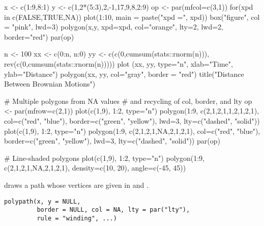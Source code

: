 %
\begin{Examples}
\begin{ExampleCode}
x <- c(1:9,8:1)
y <- c(1,2*(5:3),2,-1,17,9,8,2:9)
op <- par(mfcol=c(3,1))
for(xpd in c(FALSE,TRUE,NA)) {
  plot(1:10, main = paste("xpd =", xpd))
  box("figure", col = "pink", lwd=3)
  polygon(x,y, xpd=xpd, col="orange", lty=2, lwd=2, border="red")
}
par(op)

n <- 100
xx <- c(0:n, n:0)
yy <- c(c(0,cumsum(stats::rnorm(n))), rev(c(0,cumsum(stats::rnorm(n)))))
plot   (xx, yy, type="n", xlab="Time", ylab="Distance")
polygon(xx, yy, col="gray", border = "red")
title("Distance Between Brownian Motions")

# Multiple polygons from NA values
# and recycling of col, border, and lty
op <- par(mfrow=c(2,1))
plot(c(1,9), 1:2, type="n")
polygon(1:9, c(2,1,2,1,1,2,1,2,1),
        col=c("red", "blue"),
        border=c("green", "yellow"),
        lwd=3, lty=c("dashed", "solid"))
plot(c(1,9), 1:2, type="n")
polygon(1:9, c(2,1,2,1,NA,2,1,2,1),
        col=c("red", "blue"),
        border=c("green", "yellow"),
        lwd=3, lty=c("dashed", "solid"))
par(op)

# Line-shaded polygons
plot(c(1,9), 1:2, type="n")
polygon(1:9, c(2,1,2,1,NA,2,1,2,1),
        density=c(10, 20), angle=c(-45, 45))
\end{ExampleCode}
\end{Examples}
%
\begin{Description}\relax
{} draws a path whose vertices are
given in  and .
\end{Description}
%
\begin{Usage}
\begin{verbatim}
polypath(x, y = NULL, 
         border = NULL, col = NA, lty = par("lty"),
         rule = "winding", ...)
\end{verbatim}
\end{Usage}
%
